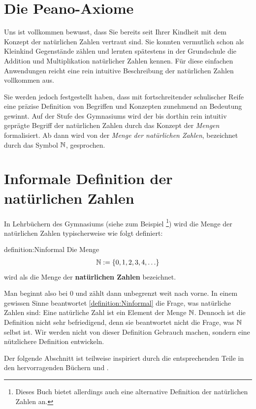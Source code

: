 \section{Die Peano-Axiome}
Uns ist vollkommen bewusst, dass Sie bereits seit Ihrer Kindheit mit dem Konzept der natürlichen Zahlen vertraut sind. Sie konnten vermutlich schon als Kleinkind Gegenstände zählen und lernten spätestens in der Grundschule die Addition und Multiplikation natürlicher Zahlen kennen. Für diese einfachen Anwendungen reicht eine rein intuitive Beschreibung der natürlichen Zahlen vollkommen aus.

Sie werden jedoch festgestellt haben, dass mit fortschreitender schulischer Reife eine präzise Definition von Begriffen und Konzepten zunehmend an Bedeutung gewinnt. Auf der Stufe des Gymnasiums wird der bis dorthin rein intuitiv geprägte Begriff der natürlichen Zahlen durch das Konzept der \textit{Mengen} formalisiert. Ab dann wird von der \textit{Menge der natürlichen Zahlen}, bezeichnet durch das Symbol $\mathbb{N}$, gesprochen.

\section{Informale Definition der natürlichen Zahlen}
In Lehrbüchern des Gymnasiums (siehe zum Beispiel \cite{ArminBarth}\footnote{Dieses Buch bietet allerdings auch eine alternative Definition der natürlichen Zahlen an.}) wird die Menge der natürlichen Zahlen typischerweise wie folgt definiert:
\begin{definition}{definition:Ninformal}
Die Menge
\begin{align*}
    \mathbb{N} := \left\{0,1,2,3,4,\ldots\right\}
\end{align*}
wird als die Menge der \textbf{natürlichen Zahlen} bezeichnet.
\end{definition}
Man beginnt also bei $0$ und zählt dann unbegrenzt weit nach vorne. In einem gewissen Sinne beantwortet \cref{definition:Ninformal} die Frage, was natürliche Zahlen sind: Eine natürliche Zahl ist ein Element der Menge $\mathbb{N}$. Dennoch ist die Definition nicht sehr befriedigend, denn sie beantwortet nicht die Frage, was $\mathbb{N}$ selbst ist. \cite{TerenceTao} Wir werden nicht von dieser Definition Gebrauch machen, sondern eine nützlichere Definition entwickeln. 

Der folgende Abschnitt ist teilweise inspiriert durch die entsprechenden Teile in den hervorragenden Büchern \cite{TerenceTao} und \cite{AmannEscher1}.

